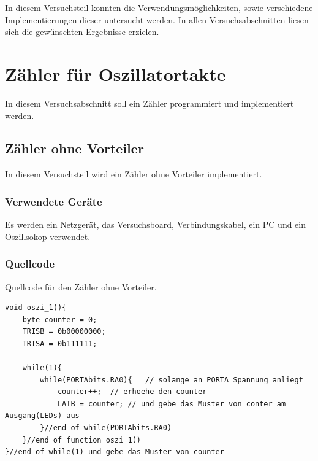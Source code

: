 \documentclass[12pt,a4paper]{article}
\begin{document}
In diesem Versuchsteil konnten die Verwendungsmöglichkeiten, sowie verschiedene Implementierungen dieser untersucht werden. In allen Versuchsabschnitten liesen sich die gewünschten Ergebnisse erzielen.

\section{Zähler für Oszillatortakte}

In diesem Versuchsabschnitt soll ein Zähler programmiert und implementiert werden.

\subsection{Zähler ohne Vorteiler}

In diesem Versuchsteil wird ein Zähler ohne Vorteiler implementiert.

\subsubsection*{Verwendete Geräte}

Es werden ein Netzgerät, das Versuchsboard, Verbindungskabel, ein PC und ein Oszillsokop verwendet.

\subsubsection*{Quellcode}

Quellcode für den Zähler ohne Vorteiler.

\lstset{language=C, basicstyle=\tiny}
\begin{lstlisting}[caption = {Zähler ohne Vorteiler}, label=lst:g_11,captionpos=b]
void oszi_1(){
	byte counter = 0;
	TRISB = 0b00000000;
	TRISA = 0b111111;
	
	while(1){
		while(PORTAbits.RA0){	// solange an PORTA Spannung anliegt
			counter++;	// erhoehe den counter
			LATB = counter;	// und gebe das Muster von conter am Ausgang(LEDs) aus
		}//end of while(PORTAbits.RA0)
	}//end of function oszi_1()
}//end of while(1) und gebe das Muster von counter
\end{lstlisting}
\end{document}
